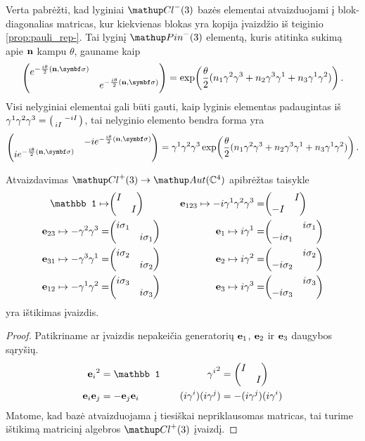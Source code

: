 Verta pabrėžti, kad lyginiai $\Clm$ bazės elementai atvaizduojami į blok-diagonalias matricas,
kur kiekvienas blokas yra kopija įvaizdžio iš teiginio \ref{prop:pauli_rep-}.
Tai lyginį $\pinm$ elementą, kuris atitinka sukimą apie $\vb n$ kampu $\theta$,
gauname kaip
\begin{equation}
		\mqty(\dmat{
			e^{-\frac{i\theta}{2}(\vb n,\symbf\sigma)},
			e^{-\frac{i\theta}{2}(\vb n,\symbf\sigma)}
		})
		=
		\exp(\frac{\theta}{2}(
			 n_1\gamma^2\gamma^3
			+n_2\gamma^3\gamma^1
			+n_3\gamma^1\gamma^2
		))
		\,.
\end{equation}
Visi nelyginiai elementai gali būti gauti,
kaip lyginis elementas padaugintas iš $\gamma^1\gamma^2\gamma^3 = \smqty(&-iI\\iI&)$,
tai nelyginio elemento bendra forma yra
\begin{equation}
		\mqty(\admat{
			-ie^{-\frac{i\theta}{2}(\vb n, \symbf\sigma)},
			 ie^{-\frac{i\theta}{2}(\vb n, \symbf\sigma)}
		})
		=
		\gamma^1\gamma^2\gamma^3 \exp(\frac{\theta}{2}(
			 n_1\gamma^2\gamma^3
			+n_2\gamma^3\gamma^1
			+n_3\gamma^1\gamma^2
		))
		\,.
\end{equation}


\begin{proposition}
	Atvaizdavimas $\Clp \to \mathup Aut(\set C^4)$ apibrėžtas taisykle
	\begin{equation}
		\begin{aligned}
			\mathbb 1	\mapsto							&\mqty(\dmat{I,I})					&\quad	\vb e_{123}	\mapsto	-i\gamma^1\gamma^2\gamma^3 =	&\mqty(\admat{I,-I})					\\
			\vb e_{23}	\mapsto	-\gamma^2 \gamma^3 =	&\mqty(\dmat{i\sigma_1,i\sigma_1})	&\quad	\vb e_1 	\mapsto	i\gamma^1 =						&\mqty(\admat{i\sigma_1,-i\sigma_1})	\\
			\vb e_{31}	\mapsto	-\gamma^3 \gamma^1 =	&\mqty(\dmat{i\sigma_2,i\sigma_2})	&\quad	\vb e_2 	\mapsto	i\gamma^2 =						&\mqty(\admat{i\sigma_2,-i\sigma_2})	\\
			\vb e_{12}	\mapsto	-\gamma^1 \gamma^2 =	&\mqty(\dmat{i\sigma_3,i\sigma_3})	&\quad	\vb e_3 	\mapsto	i\gamma^3 =						&\mqty(\admat{i\sigma_3,-i\sigma_3})	
		\end{aligned}
	\end{equation}
	yra ištikimas įvaizdis.
\end{proposition}
\begin{proof}
	Patikriname ar įvaizdis nepakeičia generatorių $\vb e_1$, $\vb e_2$ ir $\vb e_3$ 
	daugybos sąryšių.
	\begin{equation}
		\begin{aligned}
			{\vb e_i}^2 &= \mathbb1				&\quad	{\gamma^i}^2 &= \mqty(\dmat{I,I})\\
			\vb e_i \vb e_j &= -\vb e_j \vb e_i	&\quad	(i\gamma^i)(i\gamma^j) &= - (i\gamma^j)(i\gamma^i)
		\end{aligned}
	\end{equation}
	Matome, kad bazė atvaizduojama į tiesiškai nepriklausomas matricas,
	tai turime ištikimą matricinį algebros $\Clp$ įvaizdį.
\end{proof}

